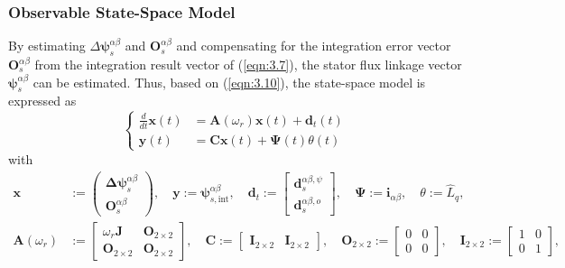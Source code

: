 \subsubsection{Observable State-Space Model}
By estimating $\Delta\boldsymbol{\psi}^{\alpha\beta}_s$ and ${\mathbf{O}}^{\alpha\beta}_s$ and compensating for the integration error vector ${\mathbf{O}}^{\alpha\beta}_s$ from the integration result vector of (\ref{eqn:3.7}), the stator flux linkage vector $\boldsymbol{\psi}^{\alpha\beta}_s$ can be estimated. Thus, based on (\ref{eqn:3.10}), the state-space model is expressed as
\begin{equation}\label{eqn:3.11}
\left\{
\begin{aligned}
    \frac{d}{dt} \mathbf{x}(t) &= \mathbf{A}(\omega_r) \mathbf{x}(t) + {\mathbf{d}_{t}}(t) \\
    \mathbf{y}(t) &= \mathbf{C} \mathbf{x}(t) + \mathbf{\Psi}(t) \theta(t)
\end{aligned}
\right.
\end{equation}
with
\begin{equation*}
\begin{aligned}
 \mathbf{x} &:= 
\begin{pmatrix}
\boldsymbol{\Delta \psi}^{\alpha\beta}_s \\
\mathbf{O}^{\alpha\beta}_s
\end{pmatrix},
\quad
\mathbf{y} := \boldsymbol{\psi}^{\alpha\beta}_{s,\text{int}}, \quad
\mathbf{d}_t := 
\begin{bmatrix}
\mathbf{d}^{\alpha\beta,\psi}_{s} \\ \mathbf{d}^{\alpha\beta,o}_{s}
\end{bmatrix}, \quad \mathbf{\Psi} := \mathbf{i}_{\alpha\beta},
\quad
\theta:= \hat L_q,
\\
\mathbf{A}(\omega_r) &:= 
\begin{bmatrix}
\omega_r \mathbf{J} & \mathbf{O}_{2\times 2} \\
\mathbf{O}_{2\times 2} & \mathbf{O}_{2\times 2}
\end{bmatrix},
\quad
\mathbf{C} := 
\begin{bmatrix}
\mathbf{I}_{2\times 2} & \mathbf{I}_{2\times 2}
\end{bmatrix}, \quad \mathbf{O}_{2\times2} := \begin{bmatrix}
0  & 0\\
0 & 0
\end{bmatrix}, \quad \mathbf{I}_{2\times2} := \begin{bmatrix}
1  & 0\\
0 & 1
\end{bmatrix},
\end{aligned}
\end{equation*}
